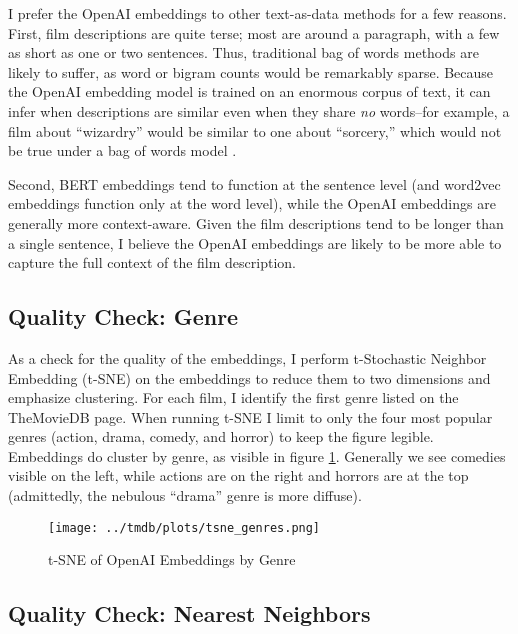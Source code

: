 \documentclass{article}
\begin{document}
I prefer the OpenAI embeddings to other text-as-data methods for a few reasons. First, film descriptions are quite terse; most are around a paragraph, with a few as short as one or two sentences. Thus, traditional bag of words methods are likely to suffer, as word or bigram counts would be remarkably sparse. Because the OpenAI embedding model is trained on an enormous corpus of text, it can infer when descriptions are similar even when they share \emph{no} words--for example, a film about ``wizardry'' would be similar to one about ``sorcery,'' which would not be true under a bag of words model \parencite{brown2020a}.

Second, BERT embeddings tend to function at the sentence level (and word2vec embeddings function only at the word level), while the OpenAI embeddings are generally more context-aware. Given the film descriptions tend to be longer than a single sentence, I believe the OpenAI embeddings are likely to be more able to capture the full context of the film description.


\subsection{Quality Check: Genre}

As a check for the quality of the embeddings, I perform t-Stochastic Neighbor Embedding (t-SNE) on the embeddings to reduce them to two dimensions and emphasize clustering. For each film, I identify the first genre listed on the TheMovieDB page. When running t-SNE I limit to only the four most popular genres (action, drama, comedy, and horror) to keep the figure legible. Embeddings do cluster by genre, as visible in figure \ref{fig:tsne}. Generally we see comedies visible on the left, while actions are on the right and horrors are at the top (admittedly, the nebulous ``drama'' genre is more diffuse).

\begin{figure}
    \texttt{[image: ../tmdb/plots/tsne\_genres.png]}
    \caption{t-SNE of OpenAI Embeddings by Genre}
    \label{fig:tsne}
\end{figure}


\subsection{Quality Check: Nearest Neighbors}
\end{document}

